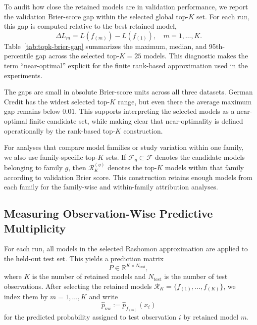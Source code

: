 To audit how close the retained models are in validation performance, we report the
validation Brier-score gap within the selected global top-$K$ set. For each run, this gap
is computed relative to the best retained model,
\[
\Delta L_m = L(f_{(m)}) - L(f_{(1)}),
\quad m = 1,\ldots,K.
\]
Table~\ref{tab:topk-brier-gap} summarizes the maximum, median, and 95th-percentile
gap across the selected top-$K=25$ models. This diagnostic makes the term
``near-optimal'' explicit for the finite rank-based approximation used in the experiments.

\begin{table}[htbp]
\centering
\caption{Validation Brier-score gaps within the global top-$K=25$ Rashomon
approximation. For each run, gaps are computed relative to the best retained model.
Values are mean $\pm$ standard deviation across runs.}
\label{tab:topk-brier-gap}
\vspace{0.4em}

\end{table}

The gaps are small in absolute Brier-score units across all three datasets. German Credit
has the widest selected top-$K$ range, but even there the average maximum gap remains
below $0.01$. This supports interpreting the selected models as a near-optimal finite
candidate set, while making clear that near-optimality is defined operationally by the
rank-based top-$K$ construction.

For analyses that compare model families or study variation within one family, we also
use family-specific top-$K$ sets. If $\mathcal{F}_g \subset \mathcal{F}$ denotes the
candidate models belonging to family $g$, then $\mathcal{R}^{(g)}_K$ denotes the top-$K$
models within that family according to validation Brier score. This construction retains
enough models from each family for the family-wise and within-family attribution
analyses.

\subsection{Measuring Observation-Wise Predictive Multiplicity}
\label{sec:meth-metrics}

For each run, all models in the selected Rashomon approximation are applied to the
held-out test set. This yields a prediction matrix
\[
P \in \mathbb{R}^{K \times N_{\text{test}}},
\]
where \(K\) is the number of retained models and \(N_{\text{test}}\) is the number of test observations.
After selecting the retained models \(\mathcal{R}_K = \{f_{(1)}, \ldots, f_{(K)}\}\), we index them by
\(m = 1,\ldots,K\) and write
\[
\hat{p}_{mi} := \hat{p}_{f_{(m)}}(x_i)
\]
for the predicted probability assigned to test observation \(i\) by retained model \(m\).

